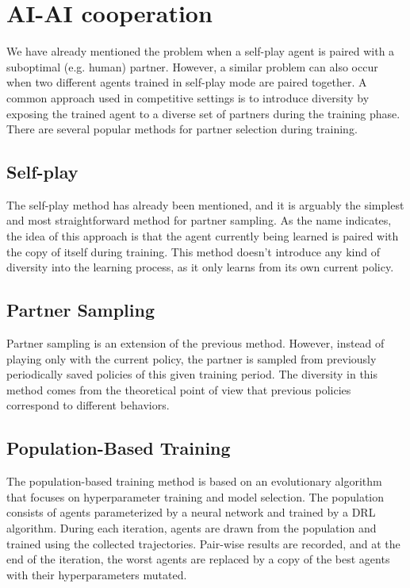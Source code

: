 \section{AI-AI cooperation}\label{aiaicooperation}
We have already mentioned the problem when a self-play agent is paired with a suboptimal (e.g. human) partner.
However, a similar problem can also occur when two different agents trained in self-play mode are paired together.
A common approach used in competitive settings is to introduce diversity by exposing the trained agent to a diverse set of partners during the training phase.
There are several popular methods for partner selection during training.

\subsection{Self-play}\label{selfplayMethod}
The self-play method has already been mentioned, and it is arguably the simplest and most straightforward method for partner sampling.
As the name indicates, the idea of this approach is that the agent currently being learned is paired with the copy of itself during training.
This method doesn't introduce any kind of diversity into the learning process, as it only learns from its own current policy.

\subsection{Partner Sampling}
Partner sampling is an extension of the previous method. 
However, instead of playing only with the current policy, the partner is sampled from previously periodically saved policies of this given training period.
The diversity in this method comes from the theoretical point of view that previous policies correspond to different behaviors.

\subsection{Population-Based Training}
The population-based training method is based on an evolutionary algorithm that focuses on hyperparameter training and model selection.
The population consists of agents parameterized by a neural network and trained by a DRL algorithm.
During each iteration, agents are drawn from the population and trained using the collected trajectories.
Pair-wise results are recorded, and at the end of the iteration, the worst agents are replaced by a copy of the best agents with their hyperparameters mutated.

